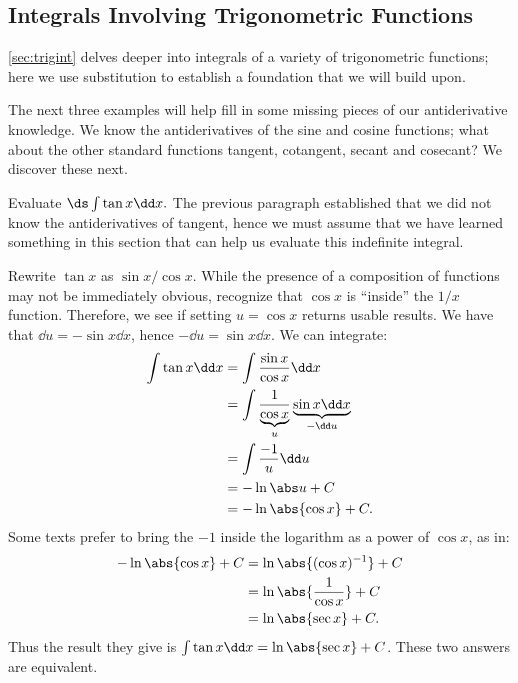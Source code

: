 \subsection{Integrals Involving Trigonometric Functions}

\autoref{sec:trigint} delves deeper into integrals of a variety of trigonometric functions; here we use substitution to establish a foundation that we will build upon. 

The next three examples will help fill in some missing pieces of our antiderivative knowledge. We know the antiderivatives of the sine and cosine functions; what about the other standard functions tangent, cotangent, secant and cosecant? We discover these next.

\begin{example}\label{ex_sub6}%
Evaluate $\ds \int \tan x\dd x.$
\solution
The previous paragraph established that we did not know the antiderivatives of tangent, hence we must assume that we have learned something in this section that  can help us evaluate this indefinite integral. 

Rewrite $\tan x$ as $\sin x/\cos x$. While the presence of a composition of functions may not be immediately obvious, recognize that $\cos x$ is ``inside'' the $1/x$ function. Therefore, we see if setting $u = \cos x$ returns usable results. We have that $\dd u = -\sin x\dd x$, hence $-\dd u = \sin x\dd x$. We can integrate:
\begin{align*}
	\int \tan x \dd x
	&= \int \frac{\sin x}{\cos x}\dd x \\
	&= \int \frac1{\underbrace{\cos x}_u}\underbrace{\sin x\dd x}_{-\dd u} \\
	&= \int \frac {-1}u \dd u\\
	&= -\ln \abs u + C \\
	&= -\ln \abs{\cos x} + C.
\end{align*}
Some texts prefer to bring the $-1$ inside the logarithm as a power of $\cos x$, as in:
\begin{align*}
	-\ln\abs{\cos x} + C
	&= \ln\abs{(\cos x)^{-1}} + C\\
	&= \ln \abs{\frac{1}{\cos x}} + C\\
	&= \ln \abs{\sec x} + C.
\end{align*}
Thus the result they give is $\int \tan x \dd x = \ln\abs{\sec x}+C$. These two answers are equivalent.
\end{example}

